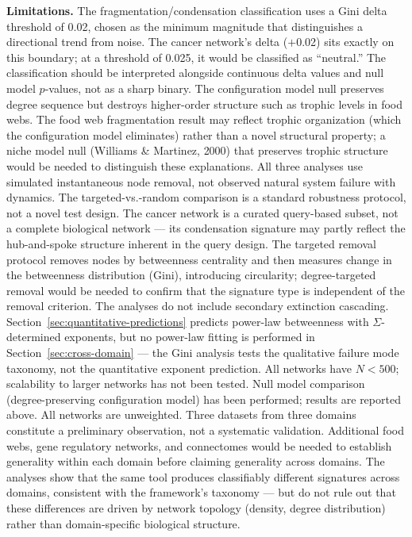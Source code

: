 \documentclass[12pt,a4paper]{article}
\begin{document}
\textbf{Limitations.} The fragmentation/condensation classification uses a Gini delta threshold of 0.02, chosen as the minimum magnitude that distinguishes a directional trend from noise. The cancer network's delta ($+$0.02) sits exactly on this boundary; at a threshold of 0.025, it would be classified as ``neutral.'' The classification should be interpreted alongside continuous delta values and null model $p$-values, not as a sharp binary. The configuration model null preserves degree sequence but destroys higher-order structure such as trophic levels in food webs. The food web fragmentation result may reflect trophic organization (which the configuration model eliminates) rather than a novel structural property; a niche model null (Williams \& Martinez, 2000) that preserves trophic structure would be needed to distinguish these explanations. All three analyses use simulated instantaneous node removal, not observed natural system failure with dynamics. The targeted-vs.-random comparison is a standard robustness protocol, not a novel test design. The cancer network is a curated query-based subset, not a complete biological network --- its condensation signature may partly reflect the hub-and-spoke structure inherent in the query design. The targeted removal protocol removes nodes by betweenness centrality and then measures change in the betweenness distribution (Gini), introducing circularity; degree-targeted removal would be needed to confirm that the signature type is independent of the removal criterion. The analyses do not include secondary extinction cascading. Section~\ref{sec:quantitative-predictions} predicts power-law betweenness with $\Sigma$-determined exponents, but no power-law fitting is performed in Section~\ref{sec:cross-domain} --- the Gini analysis tests the qualitative failure mode taxonomy, not the quantitative exponent prediction. All networks have $N < 500$; scalability to larger networks has not been tested. Null model comparison (degree-preserving configuration model) has been performed; results are reported above. All networks are unweighted. Three datasets from three domains constitute a preliminary observation, not a systematic validation. Additional food webs, gene regulatory networks, and connectomes would be needed to establish generality within each domain before claiming generality across domains. The analyses show that the same tool produces classifiably different signatures across domains, consistent with the framework's taxonomy --- but do not rule out that these differences are driven by network topology (density, degree distribution) rather than domain-specific biological structure.
\end{document}
